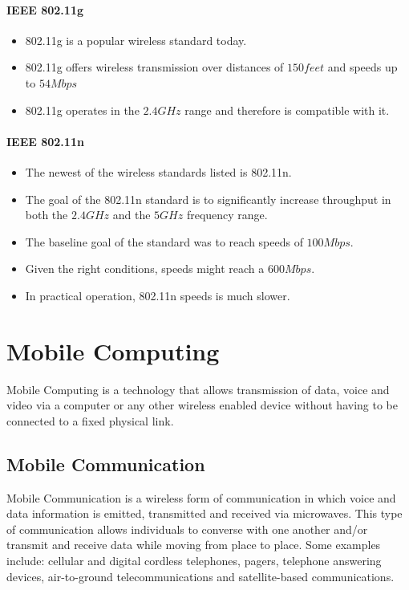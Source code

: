 \paragraph*{IEEE 802.11g}
\begin{itemize}
	\item 802.11g is a popular wireless standard today. 
	\item 802.11g offers wireless transmission over distances of $ 150 feet $ and speeds up to $  54Mbps $
	\item 802.11g operates in the $ 2.4GHz $ range and therefore is compatible with it.
\end{itemize}


\paragraph*{IEEE 802.11n}
\begin{itemize}
	\item The newest of the wireless standards listed is 802.11n. 
	\item The goal of the 802.11n standard is to significantly increase throughput in both the $ 2.4GHz $ and the $ 5GHz $ frequency range. 
	\item The baseline goal of the standard was to reach speeds of $ 100Mbps $.
	\item Given the right conditions, speeds might reach a $ 600Mbps $. 
	\item In practical operation, 802.11n speeds is much slower.
\end{itemize}



\section{Mobile Computing}
Mobile Computing is a technology that allows transmission of data, voice and video via a computer or any other wireless enabled device without having to be connected to a fixed physical link. 

\subsection{Mobile Communication}
Mobile Communication is a wireless form of communication in which
voice and data information is emitted, transmitted and received via
microwaves. This type of communication allows individuals to
converse with one another and/or transmit and receive data while
moving from place to place. Some examples include: cellular and
digital cordless telephones, pagers, telephone answering devices,
air-to-ground telecommunications and satellite-based
communications.


